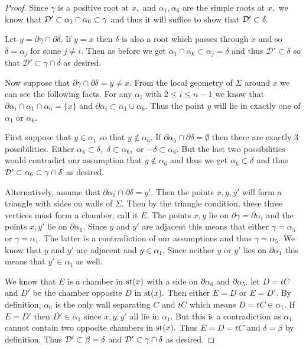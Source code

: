 \documentclass[class=book, crop=false]{standalone}
\begin{document}
\begin{proof}
	Since $\gamma$ is a positive root at $x,$ and $\alpha_1,\alpha_6$ are the simple roots at $x,$ we know that $\mathcal{D}'\subset \alpha_1\cap \alpha_6\subset \gamma$ and thus it will suffice to show that $\mathcal{D}'\subset \delta.$

	Let $y=\partial\gamma \cap \partial \delta.$ If $y=x$ then $\delta$ is also a root which passes through $x$ and so $\delta=\alpha_j$ for some $j\neq i.$ Then as before we get $\alpha_1\cap \alpha_6\subset \alpha_j=\delta$ and thus $\mathcal{D}'\subset \delta$ so that $\mathcal{D}'\subset \gamma\cap \delta$ as desired.

	Now suppose that $\partial \gamma\cap \partial \delta=y\neq x.$ From the local geometry of $\Sigma$ around $x$ we can see the following facts. For any $\alpha_i$ with $2\le i\le n-1$ we know that $\partial\alpha_i\cap \alpha_1\cap \alpha_6=\{x\}$ and $\partial\alpha_i\subset \alpha_1\cup\alpha_6.$ Thus the point $y$ will lie in exactly one of $\alpha_1$ or $\alpha_6.$

	First suppose that $y\in \alpha_1$ so that $y\not\in \alpha_6.$ If $\partial\alpha_6\cap \partial\delta=\emptyset$ then there are exactly 3 possibilities. Either $\alpha_6\subset \delta,$ $\delta\subset\alpha_6,$ or $-\delta\subset \alpha_6.$ But the last two possibilities would contradict our assumption that $y\not\in \alpha_6$ and thus we get $\alpha_6\subset \delta$ and thus $\mathcal{D}'\subset \alpha_6\subset \gamma\cap\delta$ as desired.

	Alternatively, assume that $\partial\alpha_6\cap \partial\delta=y'.$ Then the points $x,y,y'$ will form a triangle with sides on walls of $\Sigma.$ Then by the triangle condition, these three vertices must form a chamber, call it $E.$ The points $x,y$ lie on $\partial\gamma=\partial\alpha_i$ and the points $x,y'$ lie on $\partial\alpha_6.$ Since $y$ and $y'$ are adjacent this means that either $\gamma=\alpha_5$ or $\gamma=\alpha_1.$ The latter is a contradiction of our assumptions and thus $\gamma=\alpha_5.$ We know that $y$ and $y'$ are adjacent and $y\in \alpha_1.$ Since neither $y$ or $y'$ lies on $\partial\alpha_1$ this means that $y'\in \alpha_1$ as well.

	We know that $E$ is a chamber in $\mathrm{st}(x)$ with a side on $\partial \alpha_6$ and $\partial\alpha_5.$ let $D=tC$ and $D'$ be the chamber opposite $D$ in $\mathrm{st}(x).$ Then either $E=D$ or $E=D'.$ By definition, $\alpha_6$ is the only wall separating $C$ and $tC$ which means $D=tC\in \alpha_1.$ If $E=D'$ then $D'\in \alpha_1$ since $x,y,y'$ all lie in $\alpha_1.$ But this is a contradiction as $\alpha_1$ cannot contain two opposite chambers in $\mathrm{st}(x).$ Thus $E=D=tC$ and $\delta=\beta$ by definition. Thus $\mathcal{D}'\subset \beta=\delta$ and $\mathcal{D}'\subset \gamma\cap \delta$ as desired.


\end{proof}
\end{document}
